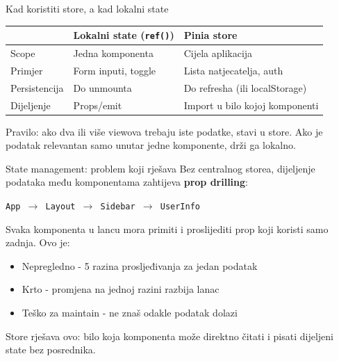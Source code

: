 \begin{frame}{Kad koristiti store, a kad lokalni state}
\begin{tabular}{@{}lp{5cm}p{5cm}@{}}
  \toprule
  & \textbf{Lokalni state (\texttt{ref()})} & \textbf{Pinia store} \\
  \midrule
  Scope & Jedna komponenta & Cijela aplikacija \\
  Primjer & Form inputi, toggle & Lista natjecatelja, auth \\
  Persistencija & Do unmounta & Do refresha (ili localStorage) \\
  Dijeljenje & Props/emit & Import u bilo kojoj komponenti \\
  \bottomrule
\end{tabular}

\vspace{0.6em}
Pravilo: ako dva ili više viewova trebaju iste podatke, stavi u store. Ako je podatak relevantan samo unutar jedne komponente, drži ga lokalno.
\end{frame}

\begin{frame}{State management: problem koji rješava}
Bez centralnog storea, dijeljenje podataka među komponentama zahtijeva \textbf{prop drilling}:

\vspace{0.4em}
\begin{center}
\texttt{App $\rightarrow$ Layout $\rightarrow$ Sidebar $\rightarrow$ UserInfo}
\end{center}

\vspace{0.4em}
Svaka komponenta u lancu mora primiti i proslijediti prop koji koristi samo zadnja. Ovo je:
\begin{itemize}
  \item Nepregledno - 5 razina prosljeđivanja za jedan podatak
  \item Krto - promjena na jednoj razini razbija lanac
  \item Teško za maintain - ne znaš odakle podatak dolazi
\end{itemize}

\vspace{0.6em}
Store rješava ovo: bilo koja komponenta može direktno čitati i pisati dijeljeni state bez posrednika.
\end{frame}

